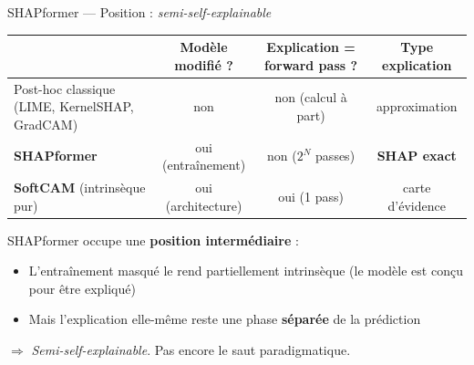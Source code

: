 \documentclass[10pt]{beamer}
\begin{document}
\begin{frame}{SHAPformer — Position : \emph{semi-self-explainable}}
  \begin{tcolorbox}[colback=blue!3, colframe=blue!50!black, arc=3mm,
                    fonttitle=\bfseries, title=Trois familles d'explicabilité — où se situe SHAPformer ?]
    \centering
    \scriptsize
    \begin{tabular}{lccc}
      \toprule
      & \textbf{Modèle modifié ?} & \textbf{Explication = forward pass ?} & \textbf{Type explication} \\
      \midrule
      Post-hoc classique (LIME, KernelSHAP, GradCAM) & non & non (calcul à part) & approximation \\
      \textbf{SHAPformer} & oui (entraînement) & non ($2^N$ passes) & \textbf{SHAP exact} \\
      \textbf{SoftCAM} (intrinsèque pur) & oui (architecture) & oui (1 pass) & carte d'évidence \\
      \bottomrule
    \end{tabular}
  \end{tcolorbox}

  \vspace{4pt}

  \begin{tcolorbox}[colback=newcontrib!5, colframe=newcontrib!70!black, arc=2mm,
                    fonttitle=\bfseries, title=Verdict]
    SHAPformer occupe une \textbf{position intermédiaire} :
    \begin{itemize}
      \item L'entraînement masqué le rend partiellement intrinsèque (le modèle est conçu pour être expliqué)
      \item Mais l'explication elle-même reste une phase \textbf{séparée} de la prédiction
    \end{itemize}
    \centering
    $\Rightarrow$ \emph{Semi-self-explainable}. Pas encore le saut paradigmatique.
  \end{tcolorbox}
\end{frame}
\end{document}
